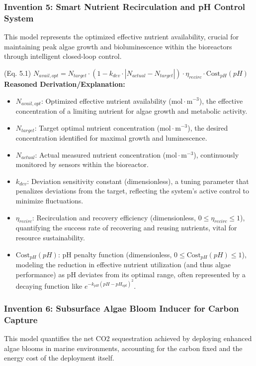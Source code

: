 \documentclass{article}
\newenvironment{reasonedderivation}{
    \textbf{Reasoned Derivation/Explanation:}
    \begin{itemize}
}{
    \end{itemize}
}
\begin{document}
\subsubsection*{Invention 5: Smart Nutrient Recirculation and pH Control System}
This model represents the optimized effective nutrient availability, crucial for maintaining peak algae growth and bioluminescence within the bioreactors through intelligent closed-loop control.

(Eq. 5.1) $N_{avail, opt} = N_{target} \cdot (1 - k_{dev} \cdot |N_{actual} - N_{target}|) \cdot \eta_{recirc} \cdot \text{Cost}_{pH}(pH)$
\begin{reasonedderivation}
    \item $N_{avail, opt}$: Optimized effective nutrient availability ($\text{mol} \cdot \text{m}^{-3}$), the effective concentration of a limiting nutrient for algae growth and metabolic activity.
    \item $N_{target}$: Target optimal nutrient concentration ($\text{mol} \cdot \text{m}^{-3}$), the desired concentration identified for maximal growth and luminescence.
    \item $N_{actual}$: Actual measured nutrient concentration ($\text{mol} \cdot \text{m}^{-3}$), continuously monitored by sensors within the bioreactor.
    \item $k_{dev}$: Deviation sensitivity constant (dimensionless), a tuning parameter that penalizes deviations from the target, reflecting the system's active control to minimize fluctuations.
    \item $\eta_{recirc}$: Recirculation and recovery efficiency (dimensionless, $0 \le \eta_{recirc} \le 1$), quantifying the success rate of recovering and reusing nutrients, vital for resource sustainability.
    \item $\text{Cost}_{pH}(pH)$: pH penalty function (dimensionless, $0 \le \text{Cost}_{pH}(pH) \le 1$), modeling the reduction in effective nutrient utilization (and thus algae performance) as pH deviates from its optimal range, often represented by a decaying function like $e^{-k_{pH}(pH-pH_{opt})^2}$.
\end{reasonedderivation}

\subsubsection*{Invention 6: Subsurface Algae Bloom Inducer for Carbon Capture}
This model quantifies the net CO2 sequestration achieved by deploying enhanced algae blooms in marine environments, accounting for the carbon fixed and the energy cost of the deployment itself.
\end{document}

